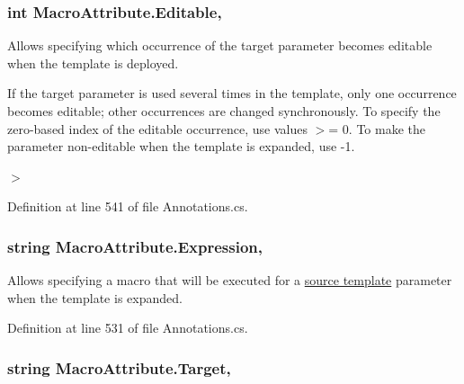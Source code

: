 \subsubsection[{Editable}]{\setlength{\rightskip}{0pt plus 5cm}int Macro\+Attribute.\+Editable\hspace{0.3cm}{\ttfamily [get]}, {\ttfamily [set]}}\label{class_macro_attribute_a273bac2efafc085eba59752b2ea3ae58}


Allows specifying which occurrence of the target parameter becomes editable when the template is deployed. 

If the target parameter is used several times in the template, only one occurrence becomes editable; other occurrences are changed synchronously. To specify the zero-\/based index of the editable occurrence, use values $>$= 0. To make the parameter non-\/editable when the template is expanded, use -\/1. 

$>$ 

Definition at line 541 of file Annotations.\+cs.

\hypertarget{class_macro_attribute_a172bf7385bb748baa1eb2fa931f1f9f8}{}
\subsubsection[{Expression}]{\setlength{\rightskip}{0pt plus 5cm}string Macro\+Attribute.\+Expression\hspace{0.3cm}{\ttfamily [get]}, {\ttfamily [set]}}\label{class_macro_attribute_a172bf7385bb748baa1eb2fa931f1f9f8}


Allows specifying a macro that will be executed for a \hyperlink{class_source_template_attribute}{source template} parameter when the template is expanded. 



Definition at line 531 of file Annotations.\+cs.

\hypertarget{class_macro_attribute_a94502148414b928f01ad540a924846d0}{}
\subsubsection[{Target}]{\setlength{\rightskip}{0pt plus 5cm}string Macro\+Attribute.\+Target\hspace{0.3cm}{\ttfamily [get]}, {\ttfamily [set]}}\label{class_macro_attribute_a94502148414b928f01ad540a924846d0}


